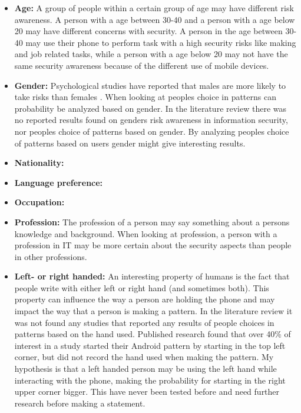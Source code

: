   \begin{itemize}
    \item {\bf Age:} A group of people within a certain group of age may have different risk awareness. A person with a age between 30-40 and a person with a age below 20 may have different concerns with security. A person in the age between 30-40 may use their phone to perform task with a high security risks like making and job related tasks, while a person with a age below 20 may not have the same security awareness because of the different use of mobile devices.
    \item {\bf Gender:} Psychological studies have reported that males are more likely to take risks than females \cite{Byrnes}. When looking at peoples choice in patterns can probability be analyzed based on gender. In the literature review there was no reported results found on genders risk awareness in information security, nor peoples choice of patterns based on gender. By analyzing peoples choice of patterns based on users gender might give interesting results. 
    \item {\bf Nationality:} 
    \item {\bf Language preference:}
    \item{\bf Occupation:}
    \item {\bf Profession:} The profession of a person may say something about a persons knowledge and background. When looking at profession, a person with a profession in IT may be more certain about the security aspects than people in other professions. 
    \item {\bf Left- or right handed:} An interesting property of humans is the fact that people write with either left or right hand (and sometimes both). This property can influence the way a person are holding the phone and may impact the way that a person is making a pattern. In the literature review it was not found any studies that reported any results of people choices in patterns based on the hand used. Published research \cite{Uellenbeck} found that over 40\% of interest in a study started their Android pattern by starting in the top left corner, but did not record the hand used when making the pattern. My hypothesis is that a left handed person may be using the left hand while interacting with the phone, making the probability for starting in the right upper corner bigger. This have never been tested before and need further research before making a statement. 

\end{itemize}

